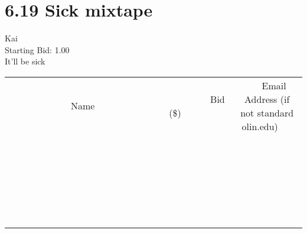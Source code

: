 \documentclass[11pt]{article}
\begin{document}
					\section*{6.19 Sick mixtape}
					Kai \\
					Starting Bid: 1.00 \\
					It'll be sick \\
					[6ex]
					\begin{tabular}{c c c}
						~~~~~~~~~~~~~Name~~~~~~~~~~~~~ & ~~~~~~~~~Bid (\$)~~~~~~~~~ & ~~~Email Address (if not standard olin.edu)~~~ \\
				
 & & \\
\hline
 & & \\
\hline
 & & \\
\hline
 & & \\
\hline
 & & \\
\hline
 & & \\
\hline
 & & \\
\hline
 & & \\
\hline
 & & \\
\hline
 & & \\
\hline
 & & \\
\hline
 & & \\
\hline
 & & \\
\hline
 & & \\
\hline
 & & \\
\hline
 & & \\
\hline
 & & \\
\hline
 & & \\
\hline
 & & \\
\hline
 & & \\
\hline
 & & \\
\hline
 & & \\
\hline
 & & \\
\hline
 & & \\
\hline
 & & \\
\hline
 & & \\
\hline
					\end{tabular}
					\clearpage
				
\end{document}
